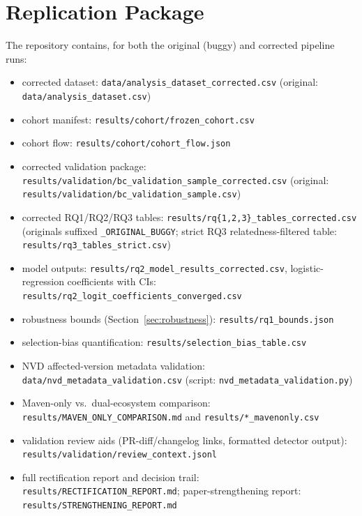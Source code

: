 \documentclass[10pt,journal]{IEEEtran}
\begin{document}
\section{Replication Package}
The repository contains, for both the original (buggy) and corrected pipeline runs:
\begin{itemize}
\item corrected dataset: \texttt{data/analysis\_dataset\_corrected.csv} (original: \texttt{data/analysis\_dataset.csv})
\item cohort manifest: \texttt{results/cohort/frozen\_cohort.csv}
\item cohort flow: \texttt{results/cohort/cohort\_flow.json}
\item corrected validation package: \texttt{results/validation/bc\_validation\_sample\_corrected.csv} (original: \texttt{results/validation/bc\_validation\_sample.csv})
\item corrected RQ1/RQ2/RQ3 tables: \texttt{results/rq\{1,2,3\}\_tables\_corrected.csv} (originals suffixed \texttt{\_ORIGINAL\_BUGGY}; strict RQ3 relatedness-filtered table: \texttt{results/rq3\_tables\_strict.csv})
\item model outputs: \texttt{results/rq2\_model\_results\_corrected.csv}, logistic-regression coefficients with CIs: \texttt{results/rq2\_logit\_coefficients\_converged.csv}
\item robustness bounds (Section~\ref{sec:robustness}): \texttt{results/rq1\_bounds.json}
\item selection-bias quantification: \texttt{results/selection\_bias\_table.csv}
\item NVD affected-version metadata validation: \texttt{data/nvd\_metadata\_validation.csv} (script: \texttt{nvd\_metadata\_validation.py})
\item Maven-only vs.\ dual-ecosystem comparison: \texttt{results/MAVEN\_ONLY\_COMPARISON.md} and \texttt{results/*\_mavenonly.csv}
\item validation review aids (PR-diff/changelog links, formatted detector output): \texttt{results/validation/review\_context.jsonl}
\item full rectification report and decision trail: \texttt{results/RECTIFICATION\_REPORT.md}; paper-strengthening report: \texttt{results/STRENGTHENING\_REPORT.md}
\end{itemize}
\end{document}
